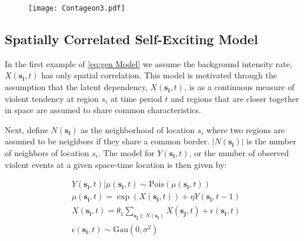 \documentclass[11pt]{isuthesis}
\begin{document}
\begin{figure}[h]
	\begin{center} %
		\vspace{6pc}
		\texttt{[image: Contageon3.pdf]}
		\label{exc} 
	\end{center}
\end{figure}



\subsection{Spatially Correlated Self-Exciting Model}

In the first example of \eqref{eq:gen Model} we assume the background intensity rate, $X(\boldsymbol{s_i},t)$ has only spatial correlation.  This model is motivated through the assumption that the latent dependency, $X(\boldsymbol{s_i},t)$, is as a continuous measure of violent tendency at region $s_i$ at time period $t$ and regions that are closer together in space are assumed to share common characteristics.  

Next, define $N(\boldsymbol{s_i})$ as the neighborhood of location $s_i$ where two regions are assumed to be neighbors if they share a common border.   $|N(\boldsymbol{s_i})|$ is the number of neighbors of location $s_i$.  The model for $Y(\boldsymbol{s_i},t)$, or the number of observed violent events at a given space-time location is then given by:

\begin{align}
& Y(\boldsymbol{s_i},t)|\mu(\boldsymbol{s_i},t) \sim \mbox{Pois}(\mu(\boldsymbol{s_i},t)) \label{eq:Full Model}\\
& \mu(\boldsymbol{s_i},t) = \exp(X(\boldsymbol{s_i},t)) + \eta Y(\boldsymbol{s_i},t-1) \nonumber \\
& X(\boldsymbol{s_i},t) = \theta_1 \sum_{\boldsymbol{s_j}\in N(\boldsymbol{s_i})}X(\boldsymbol{s_j},t) + \epsilon(\boldsymbol{s_i},t) \nonumber\\
&\epsilon(\boldsymbol{s_i},t) \sim \mbox{Gau}(0,\sigma^2) \nonumber
\end{align}
\end{document}
